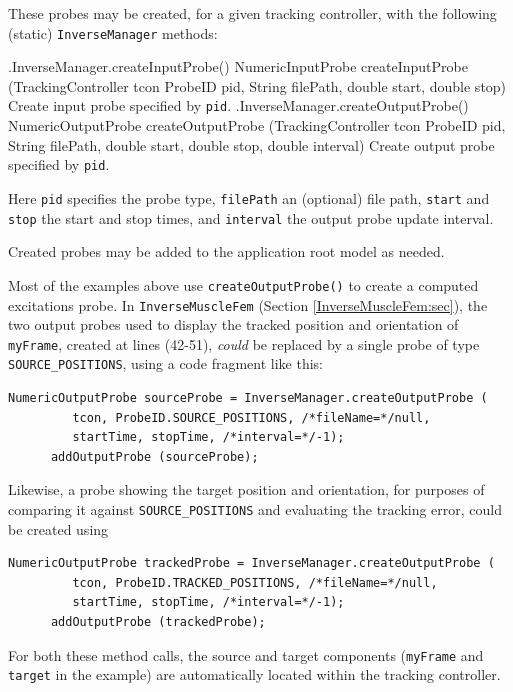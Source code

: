 These probes may be created, for a given tracking controller, with the
following (static) {\tt InverseManager} methods:
%
\begin{methodtable}{0.6}{0.4}
\midline
%
\methodentry
{\inverse.InverseManager.createInputProbe()}%
{NumericInputProbe createInputProbe (TrackingController tcon\brh
ProbeID pid, String filePath, double start, double stop)}%
{Create input probe specified by {\tt pid}.}%
%
\methodspace{0.5em}%
\methodentry
{\inverse.InverseManager.createOutputProbe()}%
{NumericOutputProbe createOutputProbe (TrackingController tcon\brh
ProbeID pid, String filePath, double start, double stop, \brh double interval)}%
{Create output probe specified by {\tt pid}.}%
%
\midline
\end{methodtable}
%
Here {\tt pid} specifies the probe type, {\tt filePath} an (optional) file
path, {\tt start} and {\tt stop} the start and stop times, and {\tt interval}
the output probe update interval.

Created probes may be added to the application root model as needed.

Most of the examples above use {\tt createOutputProbe()} to create a computed
excitations probe. In {\tt InverseMuscleFem}
(Section \ref{InverseMuscleFem:sec}), the two output probes used to display the
tracked position and orientation of {\tt myFrame}, created at lines (42-51),
{\it could} be replaced by a single probe of type {\tt SOURCE\_POSITIONS},
using a code fragment like this:
%
\begin{lstlisting}[]
      NumericOutputProbe sourceProbe = InverseManager.createOutputProbe (
         tcon, ProbeID.SOURCE_POSITIONS, /*fileName=*/null,
         startTime, stopTime, /*interval=*/-1);
      addOutputProbe (sourceProbe);
\end{lstlisting}
%
Likewise, a probe showing the target position and orientation, for purposes of
comparing it against {\tt SOURCE\_POSITIONS} and evaluating the tracking error,
could be created using
%
\begin{lstlisting}[]
      NumericOutputProbe trackedProbe = InverseManager.createOutputProbe (
         tcon, ProbeID.TRACKED_POSITIONS, /*fileName=*/null,
         startTime, stopTime, /*interval=*/-1);
      addOutputProbe (trackedProbe);
\end{lstlisting}
%
For both these method calls, the source and target components ({\tt myFrame}
and {\tt target} in the example) are automatically located within the tracking
controller.

